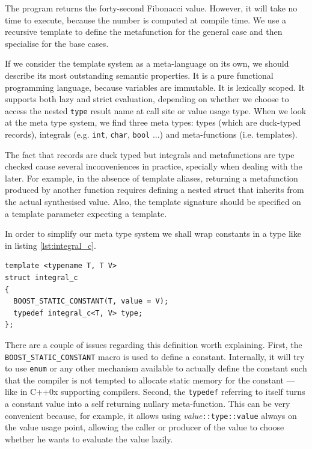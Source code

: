 The program returns the forty-second Fibonacci value. However, it will
take no time to execute, because the number is computed at compile
time. We use a recursive template to define the metafunction for the
general case and then specialise for the base cases.

If we consider the template system as a
meta-language on its own, we should describe its
most outstanding semantic properties. It is a pure functional
programming language, because variables are immutable. It is lexically
scoped. It supports both lazy and strict evaluation, depending on
whether we choose to access the nested \texttt{type} result name at
call site or value usage type. When we look at the meta type system,
we find three meta types: types (which are duck-typed records),
integrals (e.g. \texttt{int}, \texttt{char}, \texttt{bool} ...) and
meta-functions (i.e. templates).

The fact that records are duck typed but integrals and metafunctions
are type checked cause several inconveniences in practice, specially
when dealing with the later. For example, in the absence of template
aliases, returning a metafunction produced by another function
requires defining a nested struct that inherits from the actual
synthesised value. Also, the template signature should be specified on
a template parameter expecting a template.

In order to simplify our meta type system we shall wrap constants in a
type like in listing \ref{lst:integral_c}.

\begin{lstlisting}[float, 
  caption=Integral constant nullary metafunction  wrapper.,
  label=lst:integral_c]
template <typename T, T V>
struct integral_c
{
  BOOST_STATIC_CONSTANT(T, value = V);
  typedef integral_c<T, V> type;
};
\end{lstlisting}

There are a couple of issues regarding this definition worth
explaining. First, the \texttt{BOOST\_STATIC\_CONSTANT} macro is used
to define a constant. Internally, it will try to use \texttt{enum} or
any other mechanism available to actually define the constant such
that the compiler is not tempted to allocate static memory for the
constant --- like  in C++0x supporting
compilers. Second, the \texttt{typedef} referring to itself turns a
constant value into a self returning nullary meta-function. This can
be very convenient because, for example, it allows using
\emph{value}\texttt{::type::value} always on the value usage point,
allowing the caller or producer of the value to choose whether he
wants to evaluate the value lazily.

